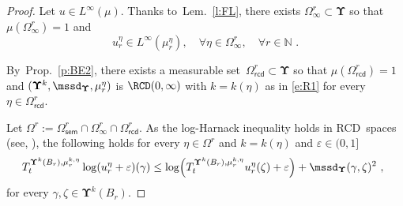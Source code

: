 \documentclass[11pt,letterpaper]{amsart}
\newcommand{\Lipu}{\mathrm{Lip}^1}
\newcommand{\N}{{\mathbb N}}
\newcommand{\comma}{\,\,\mathrm{,}\;\,}
\newcommand{\fstop}{\,\,\mathrm{.}}
\newcommand{\cdc}{\Gamma}
\newcommand{\QP}{{\mu}}
\newcommand{\e}{\varepsilon}
\newcommand{\dUpsilon}{{\mathbf \Upsilon}}
\newcommand{\U}{\dUpsilon}
\newcommand{\E}{\mathcal E}
\renewcommand{\1}{\mathbf 1}
\numberwithin{equation}{section}
\theoremstyle{plain}
\theoremstyle{definition}
\theoremstyle{remark}
\begin{document}
\begin{proof}
Let $u \in L^\infty(\QP)$. Thanks to~Lem.~\ref{l:FL},
there exists $\Omega^r_\infty \subset \dUpsilon$ so that $\QP(\Omega^r_\infty)=1$ and 
$$u_r^\eta \in L^\infty(\QP_r^\eta), \quad \forall \eta \in \Omega^r_\infty,\quad \forall r \in \N \fstop$$

By~Prop.~\ref{p:BE2}, there exists a measurable set~$\Omega^r_{\mathsf{rcd}} \subset \U$ so that $\QP(\Omega^r_{\mathsf{rcd}})=1$ and $(\U^k, \mssd_\U, \mu_r^\eta)$ is $\RCD(0,\infty)$ with $k=k(\eta)$ as in \eqref{e:R1} for every $\eta \in \Omega^r_{\mathsf{rcd}}$. 

Let $\Omega^r:=\Omega^r_{\mathsf{sem}}\cap\Omega_\infty^r \cap \Omega_{\mathsf{rcd}}^r$. As the log-Harnack inequality holds in RCD~spaces (see, \cite[Lem.~4.6]{AmbGigSav15}), the following holds for every $\eta \in \Omega^r$ and $k=k(\eta)$ and $\e\in (0,1]$
\begin{align} \label{e:LHR}
T^{\U^k(B_r), \QP_r^{k, \eta}}_t\log (u_r^\eta+\e)(\gamma) \le \log \Bigl(T^{\U^k(B_r), \QP_r^{k, \eta}}_tu_r^\eta(\zeta)+\e\Bigr) + \mssd_\U(\gamma, \zeta)^2\comma 
\end{align}
for every $\gamma, \zeta \in \U^k(B_r)$. 


\end{proof}
\end{document}
